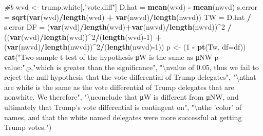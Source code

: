 \documentclass[]{article}
\newenvironment{Shaded}{\begin{snugshade}}{\end{snugshade}}
\newcommand{\CharTok}[1]{\textcolor[rgb]{0.31,0.60,0.02}{#1}}
\newcommand{\CommentTok}[1]{\textcolor[rgb]{0.56,0.35,0.01}{\textit{#1}}}
\newcommand{\DataTypeTok}[1]{\textcolor[rgb]{0.13,0.29,0.53}{#1}}
\newcommand{\DecValTok}[1]{\textcolor[rgb]{0.00,0.00,0.81}{#1}}
\newcommand{\KeywordTok}[1]{\textcolor[rgb]{0.13,0.29,0.53}{\textbf{#1}}}
\newcommand{\NormalTok}[1]{#1}
\newcommand{\OperatorTok}[1]{\textcolor[rgb]{0.81,0.36,0.00}{\textbf{#1}}}
\newcommand{\StringTok}[1]{\textcolor[rgb]{0.31,0.60,0.02}{#1}}
\begin{document}
\begin{Shaded}
\begin{Highlighting}[]
\CommentTok{#b}
\NormalTok{wvd <-}\StringTok{ }\NormalTok{trump.white[,}\StringTok{"vote.diff"}\NormalTok{]}
\NormalTok{D.hat =}\StringTok{ }\KeywordTok{mean}\NormalTok{(wvd) }\OperatorTok{-}\StringTok{ }\KeywordTok{mean}\NormalTok{(nwvd)}
\NormalTok{s.error =}\StringTok{ }\KeywordTok{sqrt}\NormalTok{(}\KeywordTok{var}\NormalTok{(wvd)}\OperatorTok{/}\KeywordTok{length}\NormalTok{(wvd) }\OperatorTok{+}\StringTok{ }\KeywordTok{var}\NormalTok{(nwvd)}\OperatorTok{/}\KeywordTok{length}\NormalTok{(nwvd))}
\NormalTok{TW =}\StringTok{ }\NormalTok{D.hat }\OperatorTok{/}\StringTok{ }\NormalTok{s.error}
\NormalTok{DF =}\StringTok{ }\NormalTok{(}\KeywordTok{var}\NormalTok{(wvd)}\OperatorTok{/}\KeywordTok{length}\NormalTok{(wvd)}\OperatorTok{+}\KeywordTok{var}\NormalTok{(nwvd)}\OperatorTok{/}\KeywordTok{length}\NormalTok{(nwvd))}\OperatorTok{^}\DecValTok{2} \OperatorTok{/}\StringTok{ }\NormalTok{((}\KeywordTok{var}\NormalTok{(wvd)}\OperatorTok{/}\KeywordTok{length}\NormalTok{(wvd))}\OperatorTok{^}\DecValTok{2}\OperatorTok{/}\NormalTok{(}\KeywordTok{length}\NormalTok{(wvd)}\OperatorTok{-}\DecValTok{1}\NormalTok{) }\OperatorTok{+}\StringTok{ }\NormalTok{(}\KeywordTok{var}\NormalTok{(nwvd)}\OperatorTok{/}\KeywordTok{length}\NormalTok{(nwvd))}\OperatorTok{^}\DecValTok{2}\OperatorTok{/}\NormalTok{(}\KeywordTok{length}\NormalTok{(nwvd)}\OperatorTok{-}\DecValTok{1}\NormalTok{))}
\NormalTok{p <-}\StringTok{ }\NormalTok{(}\DecValTok{1} \OperatorTok{-}\StringTok{ }\KeywordTok{pt}\NormalTok{(Tw, }\DataTypeTok{df=}\NormalTok{df))}
\KeywordTok{cat}\NormalTok{(}\StringTok{"Two-sample t-test of the hypothesis μW is the same as μNW p-value:"}\NormalTok{,p,}\StringTok{"which is greater than the significance"}\NormalTok{,}
    \StringTok{"}\CharTok{\textbackslash{}n}\StringTok{value of 0.05, thus we fail to reject the null hypothesis that the vote differential of Trump delegates"}\NormalTok{,}
    \StringTok{"}\CharTok{\textbackslash{}n}\StringTok{that are white is the same as the vote differential of Trump delegates that are nonwhite. We therefore"}\NormalTok{,}
    \StringTok{"}\CharTok{\textbackslash{}n}\StringTok{conclude that μW is different from μNW, and ultimately that Trump's vote differential is contingent on"}\NormalTok{,}
    \StringTok{"}\CharTok{\textbackslash{}n}\StringTok{the 'color' of names, and that the white named delegates were more successful at getting Trump votes."}\NormalTok{)}
\end{Highlighting}
\end{Shaded}
\end{document}
